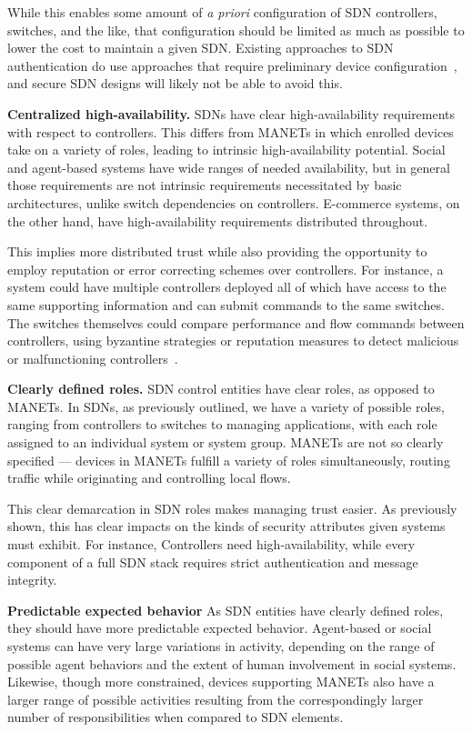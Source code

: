 \documentclass[10pt,conference]{IEEEtran}
\begin{document}
While this enables some amount of {\sl a priori} configuration of SDN controllers, switches, and the like, that configuration should be limited as much as possible to lower the cost to maintain a given SDN.  Existing approaches to SDN authentication do use approaches that require preliminary device configuration~\cite{CaFrPeLu:07}, and secure SDN designs will likely not be able to avoid this.

\noindent
{\bf Centralized high-availability.} SDNs have clear high-availability requirements with respect to controllers.  This differs from MANETs in which enrolled devices take on a variety of roles, leading to intrinsic high-availability potential.  Social and agent-based systems have wide ranges of needed availability, but in general those requirements are not intrinsic requirements necessitated by basic architectures, unlike switch dependencies on controllers.  E-commerce systems, on the other hand, have high-availability requirements distributed throughout.

This implies more distributed trust while also providing the opportunity to employ reputation or error correcting schemes over controllers.  For instance, a system could have multiple controllers deployed all of which have access to the same supporting information and can submit commands to the same switches.  The switches themselves could compare performance and flow commands between controllers, using byzantine strategies or reputation measures to detect malicious or malfunctioning controllers~\cite{FeMi:88, TaKaCh:11}.

\noindent
{\bf Clearly defined roles.} SDN control entities have clear roles, as opposed to MANETs.  In SDNs, as previously outlined, we have a variety of possible roles, ranging from controllers to switches to managing applications, with each role assigned to an individual system or system group.  MANETs are not so clearly specified --- devices in MANETs fulfill a variety of roles simultaneously, routing traffic while originating and controlling local flows.

This clear demarcation in SDN roles makes managing trust easier.  As previously shown, this has clear impacts on the kinds of security attributes given systems must exhibit.  For instance, Controllers need high-availability, while every component of a full SDN stack requires strict authentication and message integrity.

\noindent
{\bf Predictable expected behavior} As SDN entities have clearly defined roles, they should have more predictable expected behavior.  Agent-based or social systems can have very large variations in activity, depending on the range of possible agent behaviors and the extent of human involvement in social systems.  Likewise, though more constrained, devices supporting MANETs also have a larger range of possible activities resulting from the correspondingly larger number of responsibilities when compared to SDN elements.
\end{document}
